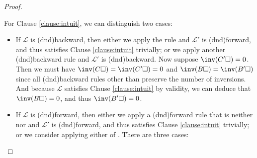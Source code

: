 \begin{proof}
\begin{enumerate}[itemsep=0.8em]
\begin{itemize}
\begin{enumerate}[itemsep=0.4em]
        For Clause \ref{clause:intuit}, we can distinguish two cases:
        \begin{itemize}
          \item If $\mathcal{L}$ is \kl(dnd){backward}, then either we apply the
          {} rule and $\mathcal{L'}$ is \kl(dnd){forward}, and thus
          satisfies Clause \ref{clause:intuit} trivially; or we apply another
          \kl(dnd){backward} rule and $\mathcal{L'}$ is \kl(dnd){backward}. Now suppose
          $\inv(C'\hole) = 0$. Then we must have $\inv(C\hole) = \inv(C'\hole) =
          0$ and $\inv(B\hole) = \inv(B'\hole)$ since all \kl(dnd){backward} rules other
          than {} preserve the number of inversions. And
          because $\mathcal{L}$ satisfies Clause \ref{clause:intuit} by
          validity, we can deduce that $\inv(B\hole) = 0$, and thus
          $\inv(B'\hole) = 0$.
          \item If $\mathcal{L}$ is \kl(dnd){forward}, then either we apply a \kl(dnd){forward} rule
          that is neither {} nor {} and
          $\mathcal{L'}$ is \kl(dnd){forward}, and thus satisfies Clause
          \ref{clause:intuit} trivially; or we consider applying either
          {} of {}. There are three cases:
\end{itemize}
\end{enumerate}
\end{itemize}
\end{enumerate}
\end{proof}
